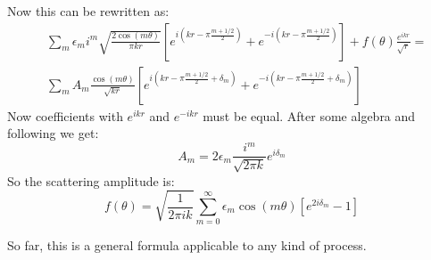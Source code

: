 Now this can be rewritten as:
\begin{equation}\label{asyR3}
\begin{split}
& \sum_m{\epsilon_m i^m \sqrt{\frac{2\cos(m\theta)}{\pi kr}}\left[e^{i\left(kr-\pi\frac{m + 1/2}{2}\right)} + e^{-i\left(kr-\pi\frac{m + 1/2}{2}\right)}\right]}
+ f(\theta)\frac{e^{ikr}}{\sqrt{r}} = \\[.7em]
& \sum_m{A_m\frac{\cos(m\theta)}{\sqrt{kr}}\left[e^{i\left(kr-\pi\frac{m + 1/2}{2} + \delta_m\right)} + e^{-i\left(kr-\pi\frac{m + 1/2}{2} + \delta_m\right)}\right]}
\end{split}
\end{equation}
Now coefficients with $ e^{ikr} $ and $ e^{-ikr} $ must be equal. After some algebra and following \cite{2DScatter2} we get:
\begin{equation}\label{AandDelta}
A_m = 2\epsilon_m \frac{i^m}{\sqrt{2\pi k}}e^{i\delta_m}
\end{equation}
So the scattering amplitude is:
\begin{equation}
f(\theta) = \sqrt{\frac{1}{2\pi i k}}\sum_{m=0}^{\infty}{\epsilon_m\cos(m\theta)\left[e^{2i\delta_m}-1\right]}
\end{equation}

So far, this is a general formula applicable to any kind of process.

